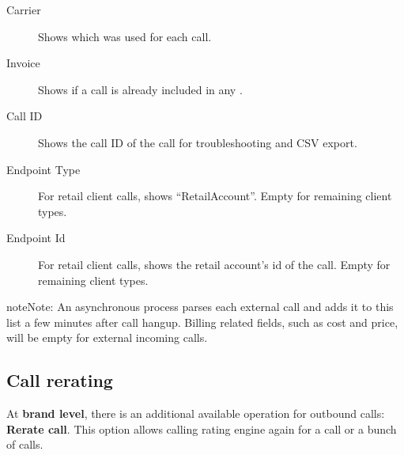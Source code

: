 \documentclass[letterpaper,10pt,english]{sphinxmanual}
\begin{document}
\begin{description}
\item[{Carrier}] \leavevmode{}\label{administration_portal/platform/external_calls:term-carrier}
Shows which {\hyperref[administration_portal/brand/providers/carriers:carriers]{}} was used for
each call.

\item[{Invoice}] \leavevmode{}\label{administration_portal/platform/external_calls:term-invoice}
Shows if a call is already included in any {\hyperref[administration_portal/brand/invoicing/invoices:invoices]{}}.

\item[{Call ID}] \leavevmode{}\label{administration_portal/platform/external_calls:term-call-id}
Shows the call ID of the call for troubleshooting and CSV export.

\item[{Endpoint Type}] \leavevmode{}\label{administration_portal/platform/external_calls:term-endpoint-type}
For retail client calls, shows ``RetailAccount''. Empty for remaining client types.

\item[{Endpoint Id}] \leavevmode{}\label{administration_portal/platform/external_calls:term-endpoint-id}
For retail client calls, shows the retail account's id of the call. Empty for remaining client types.

\end{description}

\begin{notice}{note}{Note:}
An asynchronous process parses each external call and adds it to this list a few minutes after call hangup. Billing related fields, such as cost and price, will be empty for external incoming calls.
\end{notice}


\subsection{Call rerating}
\label{administration_portal/platform/external_calls:call-rerating}
At \textbf{brand level}, there is an additional available operation for outbound calls: \textbf{Rerate call}. This option allows calling rating engine again for a call or a bunch of calls.
\end{document}
